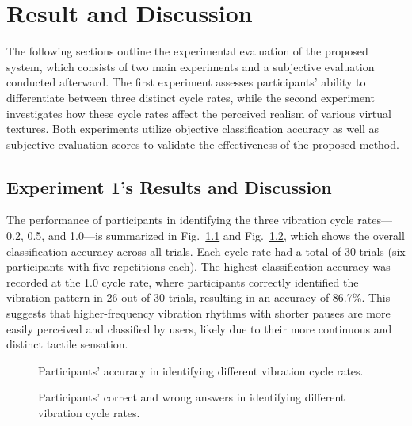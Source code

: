 \chapter{Result and Discussion} %

\label{Chapter5} %


The following sections outline the experimental evaluation of the proposed system, which consists of two main experiments and a subjective evaluation conducted afterward. The first experiment assesses participants' ability to differentiate between three distinct cycle rates, while the second experiment investigates how these cycle rates affect the perceived realism of various virtual textures. Both experiments utilize objective classification accuracy as well as subjective evaluation scores to validate the effectiveness of the proposed method.

\section{Experiment 1's Results and Discussion}
The performance of participants in identifying the three vibration cycle rates—0.2, 0.5, and 1.0—is summarized in Fig.~\ref{fig:ex1_results} and Fig.~\ref{fig:C_W_ex1}, which shows the overall classification accuracy across all trials. Each cycle rate had a total of 30 trials (six participants with five repetitions each). The highest classification accuracy was recorded at the 1.0 cycle rate, where participants correctly identified the vibration pattern in 26 out of 30 trials, resulting in an accuracy of 86.7\%. This suggests that higher-frequency vibration rhythms with shorter pauses are more easily perceived and classified by users, likely due to their more continuous and distinct tactile sensation.

\begin{figure}[H]\centering
	
	\caption{Participants' accuracy in identifying different vibration cycle rates.}\label{fig:ex1_results}
\end{figure}

\begin{figure}[H]\centering
	
	\caption{Participants' correct and wrong answers in identifying different vibration cycle rates.}\label{fig:C_W_ex1}
\end{figure}


